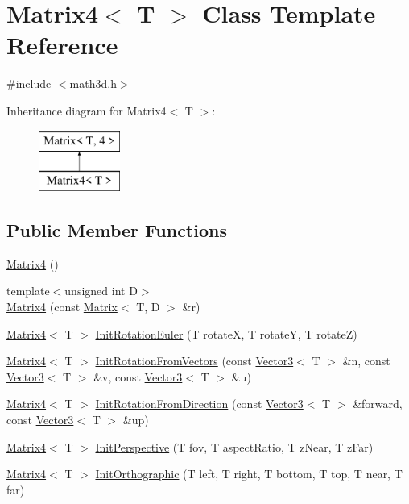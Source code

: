 \hypertarget{class_matrix4}{}\section{Matrix4$<$ T $>$ Class Template Reference}
\label{class_matrix4}


{\ttfamily \#include $<$math3d.\+h$>$}

Inheritance diagram for Matrix4$<$ T $>$\+:\begin{figure}[H]
\begin{center}
\leavevmode
\includegraphics[height=2.000000cm]{class_matrix4}
\end{center}
\end{figure}
\subsection*{Public Member Functions}
\begin{DoxyCompactItemize}
\item 
\hyperlink{class_matrix4_ab24760b5fdf4cac34df976d6820394c2}{Matrix4} ()
\item 
{\footnotesize template$<$unsigned int D$>$ }\\\hyperlink{class_matrix4_a46d918dcaacec9b797070451aa96d284}{Matrix4} (const \hyperlink{class_matrix}{Matrix}$<$ T, D $>$ \&r)
\item 
\hyperlink{class_matrix4}{Matrix4}$<$ T $>$ \hyperlink{class_matrix4_a1401d365cfc879742cc07d7a29e4a4a8}{Init\+Rotation\+Euler} (T rotate\+X, T rotate\+Y, T rotate\+Z)
\item 
\hyperlink{class_matrix4}{Matrix4}$<$ T $>$ \hyperlink{class_matrix4_aea8381025c2551b6315197908fe11542}{Init\+Rotation\+From\+Vectors} (const \hyperlink{class_vector3}{Vector3}$<$ T $>$ \&n, const \hyperlink{class_vector3}{Vector3}$<$ T $>$ \&v, const \hyperlink{class_vector3}{Vector3}$<$ T $>$ \&u)
\item 
\hyperlink{class_matrix4}{Matrix4}$<$ T $>$ \hyperlink{class_matrix4_a4f34bc6810473b714a995fa462902e61}{Init\+Rotation\+From\+Direction} (const \hyperlink{class_vector3}{Vector3}$<$ T $>$ \&forward, const \hyperlink{class_vector3}{Vector3}$<$ T $>$ \&up)
\item 
\hyperlink{class_matrix4}{Matrix4}$<$ T $>$ \hyperlink{class_matrix4_a827b624535c1d251d91a2f2b187f7045}{Init\+Perspective} (T fov, T aspect\+Ratio, T z\+Near, T z\+Far)
\item 
\hyperlink{class_matrix4}{Matrix4}$<$ T $>$ \hyperlink{class_matrix4_a37a521c8175747731ff2003b2924375d}{Init\+Orthographic} (T left, T right, T bottom, T top, T near, T far)
\end{DoxyCompactItemize}


